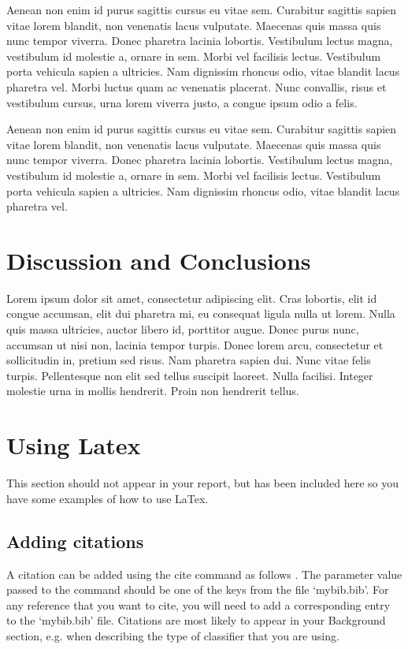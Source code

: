 \documentclass[a4paper]{article}
\begin{document}
Aenean non enim id purus sagittis cursus eu vitae sem. Curabitur sagittis sapien vitae lorem blandit, non venenatis lacus vulputate. Maecenas quis massa quis nunc tempor viverra. Donec pharetra lacinia lobortis. Vestibulum lectus magna, vestibulum id molestie a, ornare in sem. Morbi vel facilisis lectus. Vestibulum porta vehicula sapien a ultricies. Nam dignissim rhoncus odio, vitae blandit lacus pharetra vel. Morbi luctus quam ac venenatis placerat. Nunc convallis, risus et vestibulum cursus, urna lorem viverra justo, a congue ipsum odio a felis.

Aenean non enim id purus sagittis cursus eu vitae sem. Curabitur sagittis sapien vitae lorem blandit, non venenatis lacus vulputate. Maecenas quis massa quis nunc tempor viverra. Donec pharetra lacinia lobortis. Vestibulum lectus magna, vestibulum id molestie a, ornare in sem. Morbi vel facilisis lectus. Vestibulum porta vehicula sapien a ultricies. Nam dignissim rhoncus odio, vitae blandit lacus pharetra vel.

\section{Discussion and Conclusions}


Lorem ipsum dolor sit amet, consectetur adipiscing elit. Cras lobortis, elit id congue accumsan, elit dui pharetra mi, eu consequat ligula nulla ut lorem. Nulla quis massa ultricies, auctor libero id, porttitor augue. Donec purus nunc, accumsan ut nisi non, lacinia tempor turpis. Donec lorem arcu, consectetur et sollicitudin in, pretium sed risus. Nam pharetra sapien dui. Nunc vitae felis turpis. Pellentesque non elit sed tellus suscipit laoreet. Nulla facilisi. Integer molestie urna in mollis hendrerit. Proin non hendrerit tellus.


\section{Using Latex}

This section should not appear in your report, but has been included here so you have some examples of how to use LaTex.

\subsection{Adding citations}
A citation can be added using the cite command as follows \cite{Davis80-COP}. The parameter value passed to the command should be one of the keys from the file `mybib.bib'. For any reference that you want to cite, you will need to add a corresponding entry to the `mybib.bib' file. Citations are most likely to appear in your Background section, e.g. when describing the type of classifier that you are using.
\end{document}
